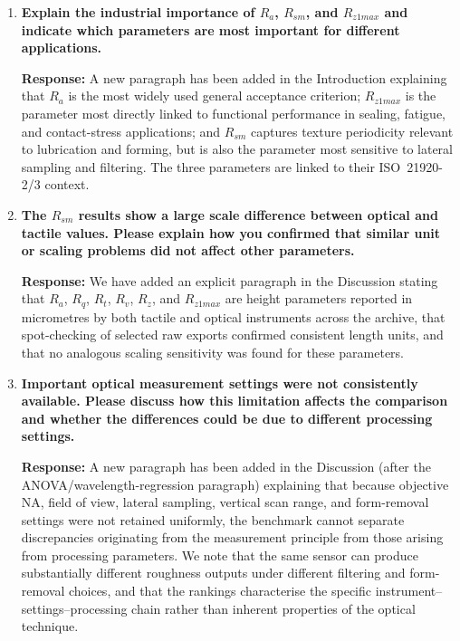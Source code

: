 \documentclass[10pt]{article}
\begin{document}
\begin{enumerate}[leftmargin=*, label=\textbf{Comment \arabic*.}, ref=\arabic*]
\textbf{Response:} We have added a structured literature comparison table (new Table~1 in the Introduction) with columns for Study, Materials, Parameters, Methods compared, Key finding, and Gap. The table includes the suggested Marichamy et~al.\ (2025) reference alongside Garc\'ia et~al., Schmidt et~al., M\'inguez-Mart\'inez et~al., Boedecker et~al., Nouira et~al., Hoefling et~al., and Hu et~al. The final row compares the present work. A concluding paragraph summarises the common pattern: prior studies discuss best-case comparability without quantifying the fixed-workflow or transfer penalties.

\item \textbf{Explain the industrial importance of $R_a$, $R_{sm}$, and $R_{z1max}$ and indicate which parameters are most important for different applications.}

\textbf{Response:} A new paragraph has been added in the Introduction explaining that $R_a$ is the most widely used general acceptance criterion; $R_{z1max}$ is the parameter most directly linked to functional performance in sealing, fatigue, and contact-stress applications; and $R_{sm}$ captures texture periodicity relevant to lubrication and forming, but is also the parameter most sensitive to lateral sampling and filtering. The three parameters are linked to their ISO~21920-2/3 context.

\item \textbf{The $R_{sm}$ results show a large scale difference between optical and tactile values. Please explain how you confirmed that similar unit or scaling problems did not affect other parameters.}

\textbf{Response:} We have added an explicit paragraph in the Discussion stating that $R_a$, $R_q$, $R_t$, $R_v$, $R_z$, and $R_{z1max}$ are height parameters reported in micrometres by both tactile and optical instruments across the archive, that spot-checking of selected raw exports confirmed consistent length units, and that no analogous scaling sensitivity was found for these parameters.

\item \textbf{Important optical measurement settings were not consistently available. Please discuss how this limitation affects the comparison and whether the differences could be due to different processing settings.}

\textbf{Response:} A new paragraph has been added in the Discussion (after the ANOVA/wavelength-regression paragraph) explaining that because objective NA, field of view, lateral sampling, vertical scan range, and form-removal settings were not retained uniformly, the benchmark cannot separate discrepancies originating from the measurement principle from those arising from processing parameters. We note that the same sensor can produce substantially different roughness outputs under different filtering and form-removal choices, and that the rankings characterise the specific instrument--settings--processing chain rather than inherent properties of the optical technique.


\end{enumerate}
\end{document}
